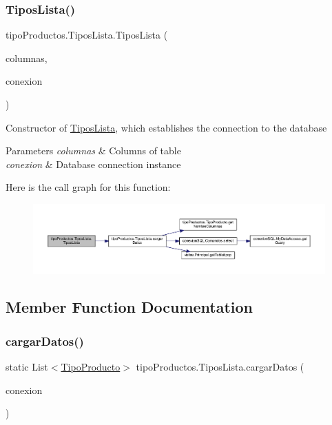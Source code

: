 \subsubsection{\texorpdfstring{Tipos\+Lista()}{TiposLista()}}
{\footnotesize\ttfamily tipo\+Productos.\+Tipos\+Lista.\+Tipos\+Lista (\begin{DoxyParamCaption}\item[{\mbox{\hyperlink{classtipo_productos_1_1_modelo_columnas_tabla_tipo_productos}{Modelo\+Columnas\+Tabla\+Tipo\+Productos}}}]{columnas,  }\item[{\mbox{\hyperlink{classconexion_s_q_l_1_1_my_data_access}{My\+Data\+Access}}}]{conexion }\end{DoxyParamCaption})}

Constructor of \mbox{\hyperlink{classtipo_productos_1_1_tipos_lista}{Tipos\+Lista}}, which establishes the connection to the database 
\begin{DoxyParams}{Parameters}
{\em columnas} & Columns of table \\
\hline
{\em conexion} & Database connection instance \\
\hline
\end{DoxyParams}
Here is the call graph for this function\+:
\nopagebreak
\begin{figure}[H]
\begin{center}
\leavevmode
\includegraphics[width=350pt]{classtipo_productos_1_1_tipos_lista_a75e4a1ac3bcb6d64c3fc5dbae72e85c5_cgraph}
\end{center}
\end{figure}


\subsection{Member Function Documentation}
\mbox{\label{classtipo_productos_1_1_tipos_lista_ad36441dd4c32340b0905b5d30b91fcb4}} 
\subsubsection{\texorpdfstring{cargar\+Datos()}{cargarDatos()}}
{\footnotesize\ttfamily static List$<$\mbox{\hyperlink{classtipo_productos_1_1_tipo_producto}{Tipo\+Producto}}$>$ tipo\+Productos.\+Tipos\+Lista.\+cargar\+Datos (\begin{DoxyParamCaption}\item[{\mbox{\hyperlink{classconexion_s_q_l_1_1_my_data_access}{My\+Data\+Access}}}]{conexion }\end{DoxyParamCaption})\hspace{0.3cm}{\ttfamily [static]}}

